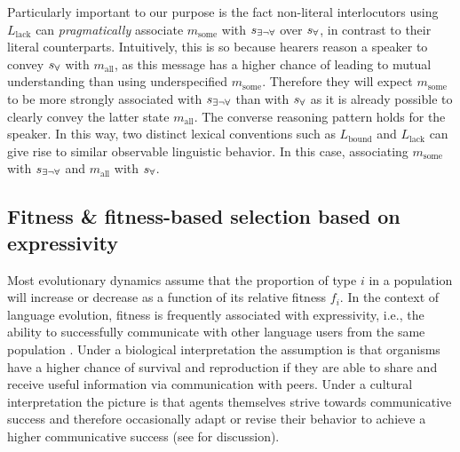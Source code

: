 \documentclass[a4paper]{article}
\newcommand{\state}{\ensuremath{s}\xspace}		%
\newcommand{\mystate}[1]{\ensuremath{\state_{\text{#1}}}\xspace} %
\newcommand{\mylang}[1]{\ensuremath{L_{\text{#1}}}\xspace} %
\newcommand{\messg}{\ensuremath{m}\xspace}		%
\newcommand{\mymessg}[1]{\ensuremath{\messg_{\text{#1}}}\xspace} %
\newcommand{\ssome}{\mystate{\ensuremath{\exists\neg\forall}}}
\newcommand{\sall}{\mystate{\ensuremath{\forall}}}
\newcommand{\msome}{\mymessg{some}}
\newcommand{\mall}{\mymessg{all}}
\newcommand{\Lbound}{\mylang{bound}}
\newcommand{\Llack}{\mylang{lack}}
\begin{document}
Particularly important to our purpose is the fact non-literal interlocutors using $\Llack$ can {\em pragmatically} associate $\msome$ with $\ssome$ over $\sall$,  in contrast to their literal counterparts. Intuitively, this is so because hearers reason a speaker to convey $\sall$ with $\mall$, as this message has a higher chance of leading to mutual understanding than using underspecified $\msome$. Therefore they will expect $\msome$ to be more strongly associated with $\ssome$ than with $\sall$ as it is already possible to clearly convey the latter state $\mall$. The converse reasoning pattern holds for the speaker. In this way, two distinct lexical conventions such as $\Lbound$ and $\Llack$ can give rise to similar observable linguistic behavior. In this case, associating $\msome$ with $\ssome$ and $\mall$ with $\sall$.

\subsection{Fitness \& fitness-based selection based on expressivity}\label{sec:expressivity}

Most evolutionary dynamics assume that the proportion of type $i$ in a population will increase
or decrease as a function of its relative fitness $f_i$. In the context of language evolution,
fitness is frequently associated with expressivity, i.e., the ability to successfully
communicate with other language users from the same population
\citep[e.g.,][]{nowak+krakauer:1999,nowak+etal:2000, nowak+etal:2002}. Under a biological
interpretation the assumption is that organisms have a higher chance of survival and
reproduction if they are able to share and receive useful information via communication with
peers. Under a cultural interpretation the picture is that agents themselves strive towards
communicative success and therefore occasionally adapt or revise their behavior to achieve a
higher communicative success (see \citealt[\S3.3]{benz+etal:2005b} for discussion).
\end{document}
